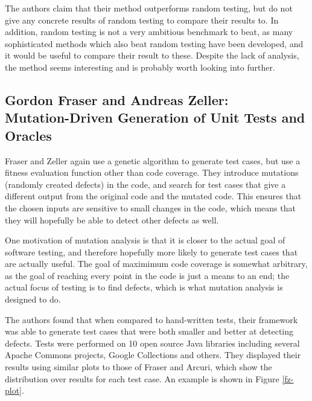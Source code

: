 \documentclass{sig-alternate-05-2015}
\begin{document}
The authors claim that their method outperforms random testing, but do not give
any concrete results of random testing to compare their results to. In
addition, random testing is not a very ambitious benchmark to beat, as many
sophisticated methods which also beat random testing have been developed, and
it would be useful to compare their result to these. Despite the lack of
analysis, the method seems interesting and is probably worth looking into
further.

\subsection{Gordon Fraser and Andreas Zeller: \\Mutation-Driven Generation of
            Unit Tests and Oracles}
\label{ma}

Fraser and Zeller \cite{fraser-zeller} again use a genetic algorithm to
generate test cases, but use
a fitness evaluation function other than code coverage. They introduce
mutations (randomly created defects) in the code, and search for test cases
that give a different output from the original code and the mutated code. This
ensures that the chosen inputs are sensitive to small changes in the code,
which means that they will hopefully be able to detect other defects as well.

One motivation of mutation analysis is that it is closer to the actual goal of
software testing, and therefore hopefully more likely to generate test cases
that are actually useful. The goal of maximimum code coverage is somewhat
arbitrary, as the goal of reaching every point in the code is just a means to
an end; the actual focus of testing is to find defects, which is what mutation
analysis is designed to do.

The authors found that when compared to hand-written tests, their framework was
able to generate test cases that were both smaller and better at detecting
defects. Tests were performed on 10 open source Java libraries including
several Apache Commons projects, Google Collections and others. They displayed
their results using similar plots to those of Fraser and Arcuri, which show
the distribution over results for each test case. An example is shown in Figure
\ref{fz-plot}.
\end{document}
